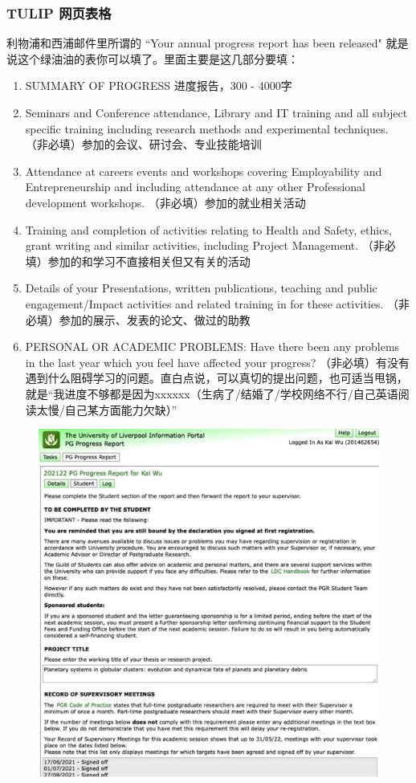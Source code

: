 \subsubsection{TULIP 网页表格}
利物浦和西浦邮件里所谓的 “Your annual progress report has been released" 就是说这个绿油油的表你可以填了。里面主要是这几部分要填：
\begin{enumerate}
    \item SUMMARY OF PROGRESS 进度报告，300 - 4000字
    \item Seminars and Conference attendance, Library and IT training and all subject specific training including research methods and experimental techniques. （非必填）参加的会议、研讨会、专业技能培训
    \item Attendance at careers events and workshops covering Employability and Entrepreneurship and including attendance at any other Professional development workshops. （非必填）参加的就业相关活动
    \item Training and completion of activities relating to Health and Safety, ethics, grant writing and similar activities, including Project Management. （非必填）参加的和学习不直接相关但又有关的活动
    \item Details of your Presentations, written publications, teaching and public engagement/Impact activities and related training in for these activities. （非必填）参加的展示、发表的论文、做过的助教
    \item PERSONAL OR ACADEMIC PROBLEMS: Have there been any problems in the last year which you feel have affected your progress? （非必填）有没有遇到什么阻碍学习的问题。直白点说，可以真切的提出问题，也可适当甩锅，就是“我进度不够都是因为xxxxxx（生病了/结婚了/学校网络不行/自己英语阅读太慢/自己某方面能力欠缺）”
\end{enumerate}

\begin{figure}[H]
    \includegraphics[width=0.7\columnwidth, center]{author-folder/Kai.Wu/TULIP.jpg}
\end{figure}

